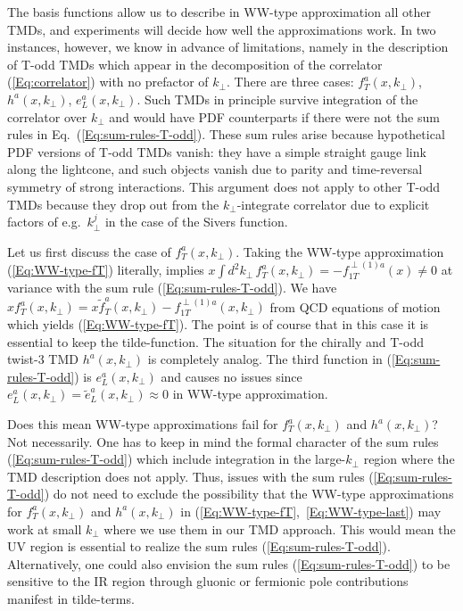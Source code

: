 \documentclass[a4paper,11pt]{article}
\def\kperp{k_\perp}
\begin{document}
The basis functions allow us to describe in WW-type approximation all other 
TMDs, and experiments will decide how well the approximations work.
In two instances, however, we know in advance of limitations, namely in the
description of T-odd TMDs which appear in the decomposition of the 
correlator (\ref{Eq:correlator}) with no prefactor of $\kperp$.
There are three cases: $f_T^a(x,k_\perp)$, $h^a(x,\kperp)$, $e_L^a(x,\kperp)$.
Such TMDs in principle survive integration of the correlator over $\kperp$
and would have PDF counterparts if there were not the sum rules in 
Eq.~(\ref{Eq:sum-rules-T-odd}). These sum rules arise because hypothetical
PDF versions of T-odd TMDs vanish: they have a simple straight gauge link
along the lightcone, and such objects vanish due to parity and time-reversal 
symmetry of strong interactions. This argument does not apply to other T-odd 
TMDs because they drop out from the $\kperp$-integrate correlator due to 
explicit factors of e.g.\ $\kperp^j$ in the case of the Sivers function.

Let us first discuss the case of $f_T^a(x,k_\perp)$. Taking the  
WW-type approximation (\ref{Eq:WW-type-fT}) literally, implies
$x\int d^2 k_\perp\,f_T^a(x,k_\perp)=-f_{1T}^{\perp(1)a}(x) \neq 0$ 
at variance with the sum rule (\ref{Eq:sum-rules-T-odd}). We 
have $xf_T^a(x,k_\perp)=x\tilde{f}_T^a(x,k_\perp)-f_{1T}^{\perp(1)a}(x,k_\perp)$ 
from QCD equations of motion \cite{Bacchetta:2006tn} which yields
(\ref{Eq:WW-type-fT}). The point is of course 
that in this case it is essential to keep the tilde-function. 
The situation for the chirally and T-odd twist-3 
TMD $h^a(x,k_\perp)$ is completely analog. The third function in
(\ref{Eq:sum-rules-T-odd}) is $e_L^a(x,k_\perp)$ and causes no issues
since $e_L^a(x,k_\perp)=\tilde{e}_L^a(x,k_\perp)\approx0$ in WW-type approximation.

Does this mean WW-type approximations fail for $f_T^a(x,k_\perp)$ 
and $h^a(x,k_\perp)$? Not necessarily. One has to keep in mind
the formal character of the sum rules (\ref{Eq:sum-rules-T-odd})
which include integration in the large-$k_\perp$ region where the TMD 
description does not apply. Thus, issues with the sum rules 
(\ref{Eq:sum-rules-T-odd}) do not need to exclude the
possibility that the WW-type approximations for $f_T^a(x,k_\perp)$ and
$h^a(x,k_\perp)$ in (\ref{Eq:WW-type-fT},~\ref{Eq:WW-type-last}) 
may work at small $k_\perp$ where we use them in our TMD approach.
This would mean the UV region is essential to realize the sum rules 
(\ref{Eq:sum-rules-T-odd}). Alternatively, one could also envision 
the sum rules (\ref{Eq:sum-rules-T-odd}) to be sensitive to the
IR region through gluonic or fermionic pole contributions manifest
in tilde-terms. 
\end{document}
